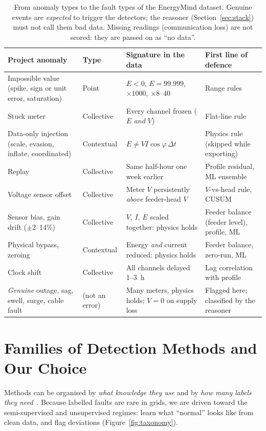 \documentclass[11pt,a4paper]{article}
\begin{document}
\begin{table}[H]
\centering
\small
\begin{tabularx}{\textwidth}{@{}>{\raggedright\arraybackslash}p{3.1cm}>{\raggedright\arraybackslash}p{2.3cm}LL@{}}
\toprule
\textbf{Project anomaly} & \textbf{Type~\cite{chandola}} & \textbf{Signature in the data} & \textbf{First line of defence} \\
\midrule
Impossible value (spike, sign or unit error, saturation) & Point & $E<0$, $E=99.999$, $\times1000$, $\times8$--$40$ & Range rules \\
Stuck meter & Collective & Every channel frozen ($E$ \emph{and} $V$) & Flat-line rule \\
Data-only injection (scale, evasion, inflate, coordinated) & Contextual & $E \neq V I \cos\varphi\,\Delta t$ & Physics rule (skipped while exporting) \\
Replay & Collective & Same half-hour one week earlier & Profile residual, ML ensemble \\
Voltage sensor offset & Collective & Meter $V$ persistently \emph{above} feeder-head $V$ & $V$-vs-head rule, CUSUM \\
Sensor bias, gain drift ($\pm$2--14\%) & Collective & $V$, $I$, $E$ scaled together: physics holds & Feeder balance (feeder level), profile, ML \\
Physical bypass, zeroing & Contextual & Energy \emph{and} current reduced: physics holds & Feeder balance, zero-run, ML \\
Clock shift & Collective & All channels delayed 1--3~h & Lag correlation with profile \\
\midrule
\emph{Genuine} outage, sag, swell, surge, cable fault & (not an error) & Many meters, physics holds; $V=0$ on supply loss & Flagged here; classified by the reasoner \\
\bottomrule
\end{tabularx}
\caption{From anomaly types to the fault types of the EnergyMind dataset. Genuine events are \emph{expected} to
trigger the detectors; the reasoner (Section~\ref{sec:stack}) must not call them bad data. Missing readings
(communication loss) are not scored: they are passed on as ``no data''.}
\label{tab:taxonomy}
\end{table}

\section{Families of Detection Methods and Our Choice}
\label{sec:families}
Methods can be organised by \emph{what knowledge they use} and by \emph{how many labels they
need}~\cite{chandola,pang}. Because labelled faults are rare in grids, we are driven toward the
semi-supervised and unsupervised regimes: learn what ``normal'' looks like from clean data, and flag
deviations (Figure~\ref{fig:taxonomy}).
\end{document}
